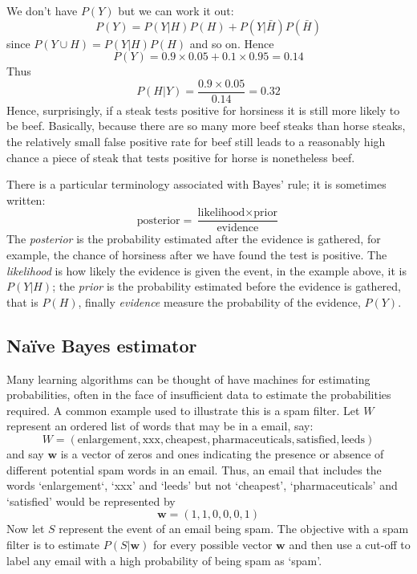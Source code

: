 \documentclass[11pt,a4paper]{scrartcl}
\begin{document}
We don't have $P(Y)$ but we can work it out:
\begin{equation}
P(Y)=P(Y|H)P(H)+P(Y|\bar{H})P(\bar{H})
\end{equation}
since $P(Y\cup H)=P(Y|H)P(H)$ and so on. Hence
\begin{equation}
P(Y)=0.9\times 0.05 + 0.1\times 0.95=0.14
\end{equation}
Thus
\begin{equation}
P(H|Y)=\frac{0.9\times 0.05}{0.14}=0.32
\end{equation}
Hence, surprisingly, if a steak tests positive for horsiness it is
still more likely to be beef. Basically, because there are so many
more beef steaks than horse steaks, the relatively small false
positive rate for beef still leads to a reasonably high chance a piece
of steak that tests positive for horse is nonetheless beef.

There is a particular terminology associated with Bayes' rule; it is
sometimes written:
\begin{equation}
\mbox{posterior}=\frac{\mbox{likelihood}\times \mbox{prior}}{\mbox{evidence}}
\end{equation}
The \textsl{posterior} is the probability estimated after the evidence
is gathered, for example, the chance of horsiness after we have found
the test is positive.  The \textsl{likelihood} is how likely the
evidence is given the event, in the example above, it is $P(Y|H)$; the
\textsl{prior} is the probability estimated before the evidence is
gathered, that is $P(H)$, finally \textsl{evidence} measure the
probability of the evidence, $P(Y)$.

\subsection*{Na\"ive Bayes estimator}

Many learning algorithms can be thought of have machines for
estimating probabilities, often in the face of insufficient data to
estimate the probabilities required. A common example used to
illustrate this is a spam filter. Let $W$ represent an ordered list of
words that may be in a email, say:
\begin{equation}
W=(\mbox{enlargement},\mbox{xxx},\mbox{cheapest},\mbox{pharmaceuticals}, \mbox{satisfied},\mbox{leeds})
\end{equation}
and say $\textbf{w}$ is a vector of zeros and ones indicating the
presence or absence of different potential spam words in an email. Thus, an email that includes the words \lq{}enlargement\lq{}, \lq{}xxx\rq{} and \lq{}leeds\rq{} but not \lq{}cheapest\rq{}, \lq{}pharmaceuticals\rq{} and \lq{}satisfied\rq{} would be represented by
\begin{equation}
\textbf{w}=(1,1,0,0,0,1)
\end{equation}
Now let $S$ represent the event of an email being spam. The objective
with a spam filter is to estimate $P(S|\textbf{w})$ for every possible
vector $\textbf{w}$ and then use a cut-off to label any email with a
high probability of being spam as \lq{}spam\rq{}.
\end{document}

